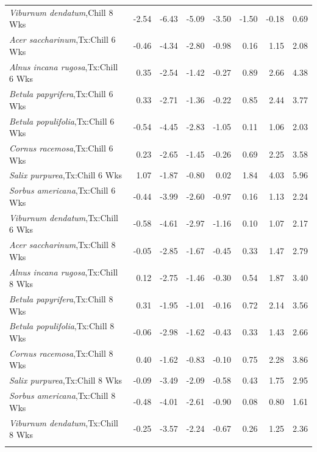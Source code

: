 \documentclass{article}\usepackage[]{graphicx}\usepackage[]{color}
\begin{document}
\begin{longtable}{lrrrrrrr}
  \textit{Viburnum dendatum},Chill 8 Wks & -2.54 & -6.43 & -5.09 & -3.50 & -1.50 & -0.18 & 0.69 \\ 
  \textit{Acer saccharinum},Tx:Chill 6 Wks & -0.46 & -4.34 & -2.80 & -0.98 & 0.16 & 1.15 & 2.08 \\ 
  \textit{Alnus incana rugosa},Tx:Chill 6 Wks & 0.35 & -2.54 & -1.42 & -0.27 & 0.89 & 2.66 & 4.38 \\ 
  \textit{Betula papyrifera},Tx:Chill 6 Wks & 0.33 & -2.71 & -1.36 & -0.22 & 0.85 & 2.44 & 3.77 \\ 
  \textit{Betula populifolia},Tx:Chill 6 Wks & -0.54 & -4.45 & -2.83 & -1.05 & 0.11 & 1.06 & 2.03 \\ 
  \textit{Cornus racemosa},Tx:Chill 6 Wks & 0.23 & -2.65 & -1.45 & -0.26 & 0.69 & 2.25 & 3.58 \\ 
  \textit{Salix purpurea},Tx:Chill 6 Wks & 1.07 & -1.87 & -0.80 & 0.02 & 1.84 & 4.03 & 5.96 \\ 
  \textit{Sorbus americana},Tx:Chill 6 Wks & -0.44 & -3.99 & -2.60 & -0.97 & 0.16 & 1.13 & 2.24 \\ 
  \textit{Viburnum dendatum},Tx:Chill 6 Wks & -0.58 & -4.61 & -2.97 & -1.16 & 0.10 & 1.07 & 2.17 \\ 
  \textit{Acer saccharinum},Tx:Chill 8 Wks & -0.05 & -2.85 & -1.67 & -0.45 & 0.33 & 1.47 & 2.79 \\ 
  \textit{Alnus incana rugosa},Tx:Chill 8 Wks & 0.12 & -2.75 & -1.46 & -0.30 & 0.54 & 1.87 & 3.40 \\ 
  \textit{Betula papyrifera},Tx:Chill 8 Wks & 0.31 & -1.95 & -1.01 & -0.16 & 0.72 & 2.14 & 3.56 \\ 
  \textit{Betula populifolia},Tx:Chill 8 Wks & -0.06 & -2.98 & -1.62 & -0.43 & 0.33 & 1.43 & 2.66 \\ 
  \textit{Cornus racemosa},Tx:Chill 8 Wks & 0.40 & -1.62 & -0.83 & -0.10 & 0.75 & 2.28 & 3.86 \\ 
  \textit{Salix purpurea},Tx:Chill 8 Wks & -0.09 & -3.49 & -2.09 & -0.58 & 0.43 & 1.75 & 2.95 \\ 
  \textit{Sorbus americana},Tx:Chill 8 Wks & -0.48 & -4.01 & -2.61 & -0.90 & 0.08 & 0.80 & 1.61 \\ 
  \textit{Viburnum dendatum},Tx:Chill 8 Wks & -0.25 & -3.57 & -2.24 & -0.67 & 0.26 & 1.25 & 2.36 \\ 
   \hline
\hline
\label{tab:suppmoddvr}
\end{longtable}
\end{document}
